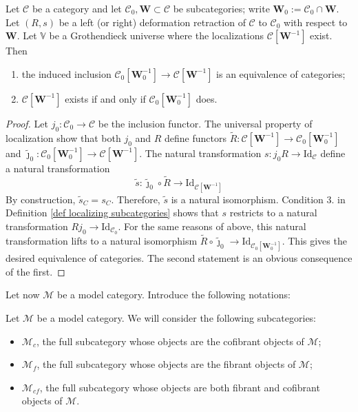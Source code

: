 \begin{prop} \label{prop localizing subcategories}
Let $\mathcal C$ be a category and let $\mathcal C_0, \mathbf W \subset \mathcal C$ be subcategories; write $\mathbf W_0 := \mathcal C_0 \cap \mathbf W$. Let $(R,s)$ be a left (or right) deformation retraction of $\mathcal C$ to $\mathcal C_0$ with respect to $\mathbf W$. Let $\mathbb V$ be a Grothendieck universe where the localizations $\mathcal C[\mathbf W^{-1}]$ exist. Then
\begin{enumerate}
\item the induced inclusion $\mathcal C_0[\mathbf W_0^{-1}] \to \mathcal C[\mathbf W^{-1}]$ is an equivalence of categories;
\item $\mathcal C[\mathbf W^{-1}]$ exists if and only if $\mathcal C_0[\mathbf W_0^{-1}]$ does.
\end{enumerate}
\end{prop}

\begin{proof}
Let $j_0 \colon \mathcal C_0 \to \mathcal C$ be the inclusion functor. The universal property of localization show that both $j_0$ and $R$ define functors $\widetilde{R} \colon \mathcal C[\mathbf W^{-1}] \to \mathcal C_0[\mathbf W_0^{-1}]$ and $\widetilde{\jmath}_0 \colon \mathcal C_0[\mathbf W_0^{-1}] \to \mathcal C[\mathbf W^{-1}]$. The natural transformation $s \colon j_0 R \to \mathrm{Id}_{\mathcal C}$ define a natural transformation
\[
\widetilde{s} \colon \widetilde{\jmath}_0 \circ \widetilde{R} \to \mathrm{Id}_{\mathcal C[\mathbf W^{-1}]}
\]
By construction, $\widetilde{s}_C = s_C$. Therefore, $\widetilde{s}$ is a natural isomorphism. Condition 3. in Definition \ref{def localizing subcategories} shows that $s$ restricts to a natural transformation $R j_0 \to \mathrm{Id}_{\mathcal C_0}$. For the same reasons of above, this natural transformation lifts to a natural isomorphism $\widetilde{R} \circ  \widetilde{\jmath}_0 \to \mathrm{Id}_{\mathcal C_0[\mathbf W_0^{-1}]}$. This gives the desired equivalence of categories. The second statement is an obvious consequence of the first.
\end{proof}

Let now $\mathcal M$ be a model category. Introduce the following notations:

\begin{notation}
Let $\mathcal M$ be a model category. We will consider the following subcategories:
\begin{itemize}
\item $\mathcal M_c$, the full subcategory whose objects are the cofibrant objects of $\mathcal M$;
\item $\mathcal M_f$, the full subcategory whose objects are the fibrant objects of $\mathcal M$;
\item $\mathcal M_{cf}$, the full subcategory whose objects are both fibrant and cofibrant objects of $\mathcal M$.
\end{itemize}
\end{notation}

